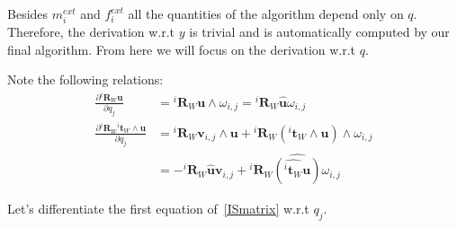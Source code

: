 Besides $m_i^{ext}$ and $f_i^{ext}$ all the quantities of the algorithm depend only on $q$.
Therefore, the derivation w.r.t $y$ is trivial and is automatically computed by our final algorithm.
From here we will focus on the derivation w.r.t $q$.

Note the following relations:
\begin{align}
  \frac{\partial {}^i\mathbf{R}_W \mathbf{u}}{\partial q_j}
  &= {}^i\mathbf{R}_W \mathbf{u} \wedge \omega_{i,j}
  = {}^i\mathbf{R}_W \widehat{\mathbf{u}} \omega_{i,j}
  \\
  \frac{\partial {}^i\mathbf{R}_W {}^i\mathbf{t}_W\wedge \mathbf{u}}{\partial q_j}
  &= {}^i\mathbf{R}_W \mathbf{v}_{i,j} \wedge \mathbf{u}
  + {}^i\mathbf{R}_W \left({}^i\mathbf{t}_W\wedge\mathbf{u}\right) \wedge \omega_{i,j}\\
  &= -{}^i\mathbf{R}_W \widehat{\mathbf{u}} \mathbf{v}_{i,j}
  + {}^i\mathbf{R}_W \widehat{\left(\widehat{{}^i\mathbf{t}_W}\mathbf{u}\right)} \omega_{i,j}
\end{align}

Let's differentiate the first equation of~\ref{ISmatrix} w.r.t $q_j$.

